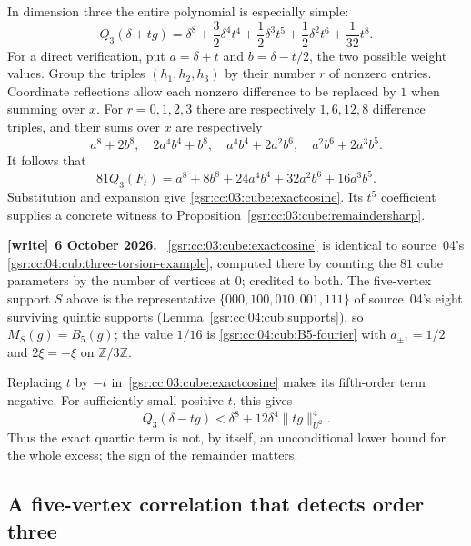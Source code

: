 \documentclass[11pt,letterpaper]{article}
\numberwithin{equation}{section}
\theoremstyle{definition}
\theoremstyle{remark}
\newcommand{\Z}{\mathbb Z}
\newcommand{\1}{\mathbf 1}
\newenvironment{writenote}[1][]{\par\smallskip\begingroup\small
 \noindent\textbf{[write]}\if\relax\detokenize{#1}\relax\else~\textbf{#1.}\fi\ }%
 {\par\endgroup\smallskip}
\begin{document}
In dimension three the entire polynomial is especially simple:
\begin{equation}
 Q_3(\delta+t g)=\delta^8+
  \frac32\delta^4t^4+\frac12\delta^3t^5+
  \frac12\delta^2t^6+\frac1{32}t^8.
 \label{gsr:cc:03:cube:exactcosine}
\end{equation}
For a direct verification, put $a=\delta+t$ and $b=\delta-t/2$, the
two possible weight values.  Group the triples $(h_1,h_2,h_3)$ by
their number $r$ of nonzero entries.  Coordinate reflections allow
each nonzero difference to be replaced by $1$ when summing over $x$.
For $r=0,1,2,3$ there are respectively $1,6,12,8$ difference triples,
and their sums over $x$ are respectively
\[
 a^8+2b^8,\quad 2a^4b^4+b^8,\quad
 a^4b^4+2a^2b^6,\quad a^2b^6+2a^3b^5.
\]
It follows that
\[
 81Q_3(F_t)=a^8+8b^8+24a^4b^4+32a^2b^6+16a^3b^5.
\]
Substitution and expansion give \eqref{gsr:cc:03:cube:exactcosine}.  Its
$t^5$ coefficient supplies a concrete witness to
Proposition~\ref{gsr:cc:03:cube:remaindersharp}.
\begin{writenote}[6 October 2026]
\eqref{gsr:cc:03:cube:exactcosine} is identical to source~04's \eqref{gsr:cc:04:cub:three-torsion-example}, computed there by counting the $81$ cube parameters by the number of vertices at $0$; credited to both. The five-vertex support $S$ above is the representative $\{000,100,010,001,111\}$ of source~04's eight surviving quintic supports (Lemma~\ref{gsr:cc:04:cub:supports}), so $M_S(g)=B_5(g)$; the value $1/16$ is \eqref{gsr:cc:04:cub:B5-fourier} with $a_{\pm1}=1/2$ and $2\xi=-\xi$ on $\Z/3\Z$.
\end{writenote}

Replacing $t$ by $-t$ in~\eqref{gsr:cc:03:cube:exactcosine} makes its fifth-order
term negative. For sufficiently small positive $t$, this gives
\[
 Q_3(\delta-tg)<\delta^8+12\delta^4\|tg\|_{U^2}^4.
\]
Thus the exact quartic term is not, by itself, an unconditional lower
bound for the whole excess; the sign of the remainder matters.

\subsection{A five-vertex correlation that detects order three}
\end{document}
